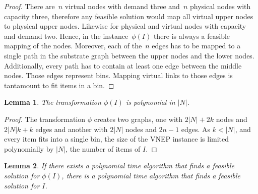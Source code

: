 \documentclass[conference]{IEEEtran}
\newtheorem{lemma}{Lemma}[section]
\begin{document}
\begin{proof}
There are~$n$ virtual nodes with demand three and~$n$ physical nodes with capacity three, therefore any feasible solution would map all virtual upper nodes to physical upper nodes. Likewise for physical and virtual nodes with capacity and demand two.
Hence, in the instance~$\phi(I)$ there is always a feasible mapping of the nodes.
Moreover, each of the~$n$ edges has to be mapped to a single path in the substrate graph between the upper nodes and the lower nodes.
Additionally, every path has to contain at least one edge between the middle nodes.
Those edges represent bins.
Mapping virtual links to those edges is tantamount to fit items in a bin.
\end{proof}


\begin{lemma} \label{lem:transpol}
  The transformation $\phi(I)$ is polynomial in $|N|$.
\end{lemma}

\begin{proof}
The transformation $\phi$ creates two graphs, one with $2|N| + 2k$ nodes and $2|N|k + k$ edges and another with $2|N|$ nodes and $2n - 1$ edges. 
As $k < |N|$, and every item fits into a single bin, the size of the VNEP instance is limited polynomially by $|N|$, the number of items of $I$.
\end{proof}

\begin{lemma} \label{lem:polapp}
  If there exists a polynomial time algorithm that finds a feasible solution for $\phi(I)$, there is a polynomial time algorithm that finds a feasible solution for $I$.
\end{lemma}
\end{document}
